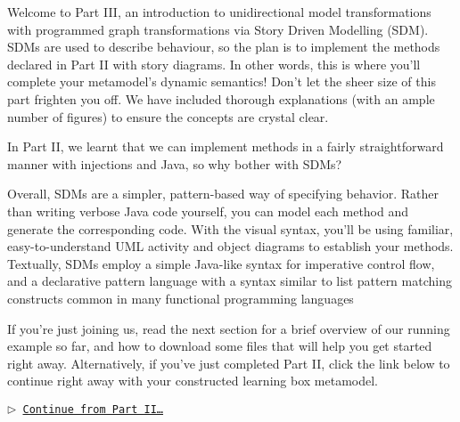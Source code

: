 \genHeader
{}

Welcome to Part III, an introduction to unidirectional model transformations with programmed graph transformations via Story Driven Modelling (SDM).
SDMs are used to describe behaviour, so the plan is to implement the methods declared in Part II with story diagrams. In other words,
this is where you'll complete your metamodel's dynamic semantics! Don't let the sheer size of this part frighten you off. We have included thorough
explanations (with an ample number of figures) to ensure the concepts are crystal clear.

In Part II, we learnt that we can implement methods in a fairly straightforward manner with injections and Java, so why bother with SDMs?

Overall, SDMs are a simpler, pattern-based way of specifying behavior. Rather than writing verbose Java code yourself, you can model each method and generate
the corresponding code. With the visual syntax, you'll be using familiar, easy-to-understand UML activity and object diagrams to establish your methods.
Textually, SDMs employ a simple Java-like syntax for imperative control flow, and a declarative pattern language with a syntax similar to list pattern matching
constructs common in many functional programming languages

If you're just joining us, read the next section for a brief overview of our running example so far, and how to download some files that will help you get
started right away. Alternatively, if you've just completed Part II, click the link below to continue right away with your constructed learning box metamodel.

\begin{center}\texttt{$\triangleright$ \hyperlink{explanation}{Continue from Part II\ldots}}\end{center}
